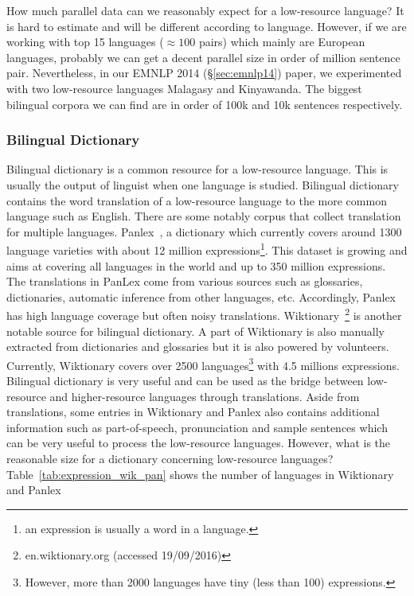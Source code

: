 \documentclass[12pt,twoside,final,hidelinks]{ltthesis}
\theoremstyle{definition}
\newcommand\emnlpiv{EMNLP 2014 (\S\ref{sec:emnlp14})}
\begin{document}
How much parallel data can we reasonably expect for a low-resource language? It is hard to 
estimate and will be different according to language. However, if we are working with top 15 
languages ($\approx100$ pairs) which mainly are European languages, probably we can get a 
decent parallel size in order of million sentence pair. Nevertheless, in our \emnlpiv{} paper, 
we experimented with two low-resource languages Malagasy and Kinyawanda. The biggest bilingual 
corpora we can find are in order of 100k and 10k sentences respectively.

\subsubsection{Bilingual Dictionary}
Bilingual dictionary is a common resource for a low-resource language. This is usually the output of linguist when one language is studied. Bilingual dictionary contains the word translation of a low-resource language to the more common language such as English. 
There are some notably corpus that collect translation for multiple languages. 
Panlex~\cite{Kamholz14}, a dictionary which currently covers around 1300 language varieties with about 12 million expressions\footnote{an expression is usually a word in a language.}. This dataset is growing and aims at covering all languages in the world and up to 350 million expressions. 
The translations in PanLex come from various sources such as glossaries, dictionaries, automatic inference from other languages, etc. 
Accordingly, Panlex has high language coverage but often noisy translations.
Wiktionary~\footnote{en.wiktionary.org (accessed 19/09/2016)} is another notable source for bilingual dictionary. A part of Wiktionary 
is also manually extracted from dictionaries and glossaries but it is also powered by 
volunteers. Currently, Wiktionary covers over 2500 languages\footnote{However, more than 2000 languages have tiny (less than 100) expressions.} with 4.5 millions expressions. 
Bilingual dictionary is very useful and can be used as the bridge between low-resource and higher-resource languages through translations. Aside from translations, some entries in Wiktionary and Panlex also contains additional information such as part-of-speech, pronunciation and sample sentences which can be very useful to process the low-resource languages. 
However, what is the reasonable size for a dictionary concerning low-resource languages? 
Table~\ref{tab:expression_wik_pan} shows the number of languages in Wiktionary and Panlex 
\end{document}
